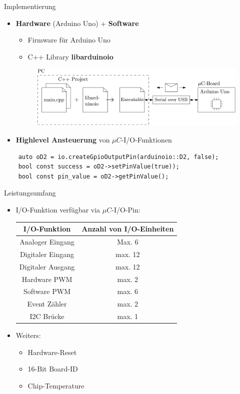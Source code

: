 \documentclass{beamer}
\begin{document}
\begin{frame}[fragile]{Implementierung}
	\begin{itemize}
		\item \textbf{Hardware} (Arduino Uno) + \textbf{Software}
		\begin{itemize}
			\item Firmware f\"ur Arduino Uno
			\item C++ Library \textbf{libarduinoio}
		\end{itemize}
		\begin{figure}[htbp]
			\centering
			\includegraphics[scale=0.2]{./images/arduinoio-system-overview.png}
		\end{figure}
		\item \textbf{Highlevel Ansteuerung} von $\mu{}C$-I/O-Funktionen
	\end{itemize}
	\begin{lstlisting}
	auto oD2 = io.createGpioOutputPin(arduinoio::D2, false);
	bool const success = oD2->setPinValue(true));
	bool const pin_value = oD2->getPinValue();
	\end{lstlisting}
\end{frame}
\begin{frame}{Leistungsumfang}
	\begin{itemize}
		\item I/O-Funktion verf\"ugbar via $\mu{}C$-I/O-Pin:
		\begin{table}[htbp]
			\begin{tabular}{|c|c|}
				\hline 
				\textbf{I/O-Funktion} & \textbf{Anzahl von I/O-Einheiten} \\ 
				\hline \hline 
				Analoger Eingang & Max. 6 \\ 
				\hline 
				Digitaler Eingang & max. 12  \\ 
				\hline
				Digitaler Ausgang & max. 12 \\ 
				\hline
				Hardware PWM & max. 2 \\ 
				\hline
				Software PWM & max. 6 \\ 
				\hline
				Event Z\"ahler & max. 2 \\
				\hline
				I2C Br\"ucke & max. 1 \\
				\hline
			\end{tabular}
		\end{table}
		\item Weiters:
		\begin{itemize}
			\item Hardware-Reset
			\item 16-Bit Board-ID
			\item Chip-Temperature
		\end{itemize}
	\end{itemize}
\end{frame}
\end{document}
